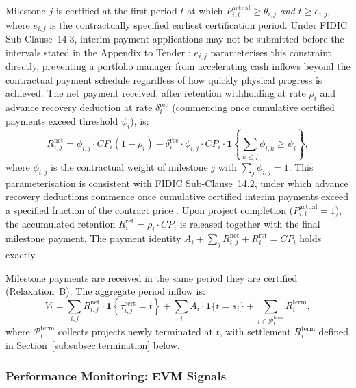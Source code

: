 Milestone $j$ is certified at the first period $t$ at which
$P_{i,t}^{\mathrm{actual}} \geq \theta_{i,j}$ \emph{and}
$t \geq e_{i,j}$, where $e_{i,j}$ is the contractually specified
earliest certification period. Under FIDIC Sub-Clause~14.3, interim
payment applications may not be submitted before the intervals stated
in the Appendix to Tender \citep{FIDIC2017}; $e_{i,j}$ parameterises
this constraint directly, preventing a portfolio manager from
accelerating cash inflows beyond the contractual payment schedule
regardless of how quickly physical progress is achieved. The net payment received,
after retention withholding at rate $\rho_i$ and advance recovery
deduction at rate $\delta_i^{\mathrm{rec}}$ (commencing once cumulative
certified payments exceed threshold $\psi_i$), is:
\begin{equation}
  R_{i,j}^{\mathrm{net}}
    = \phi_{i,j} \cdot CP_i (1 - \rho_i)
      - \delta_i^{\mathrm{rec}} \cdot \phi_{i,j} \cdot CP_i
        \cdot \mathbf{1}\!\left\{
          \textstyle\sum_{k \leq j} \phi_{i,k} \geq \psi_i
        \right\},
  \label{eq:Rnet}
\end{equation}
where $\phi_{i,j}$ is the contractual weight of milestone $j$ with
$\sum_j \phi_{i,j} = 1$. This parameterisation is consistent with FIDIC
Sub-Clause~14.2, under which advance recovery deductions commence once
cumulative certified interim payments exceed a specified fraction of the
contract price \citep{FIDIC2017}. Upon project completion
($P_{i,t}^{\mathrm{actual}} = 1$), the accumulated retention
$R_i^{\mathrm{ret}} = \rho_i \cdot CP_i$ is released together with the
final milestone payment. The payment identity
$A_i + \sum_j R_{i,j}^{\mathrm{net}} + R_i^{\mathrm{ret}} = CP_i$
holds exactly.

Milestone payments are received in the same period they are certified
(Relaxation~B). The aggregate period inflow is:
\begin{equation}
  V_t
    = \sum_{i,j} R_{i,j}^{\mathrm{net}}
        \cdot \mathbf{1}\!\left\{
          \tau_{i,j}^{\mathrm{cert}} = t
        \right\}
      + \sum_{i} A_i \cdot \mathbf{1}\{t = s_i\}
      + \sum_{i \in \mathcal{P}_t^{\mathrm{term}}} R_i^{\mathrm{term}},
  \label{eq:Vt}
\end{equation}
where $\mathcal{P}_t^{\mathrm{term}}$ collects projects newly terminated
at $t$, with settlement $R_i^{\mathrm{term}}$ defined in
Section~\ref{subsubsec:termination} below.

\subsubsection{Performance Monitoring: EVM Signals}
\label{subsubsec:evm}

